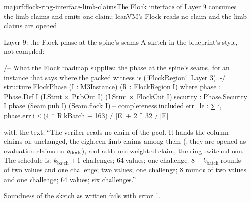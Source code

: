 \begin{finding}{major}{f:flock-ring-interface-limb-claims}{The Flock interface of Layer 9 consumes
the limb claims and emits one claim; leanVM's Flock reads no claim and the limb claims are opened}
\begin{change}{Layer 9: the Flock phase at the spine's seams}
\asproposed A sketch in the blueprint's style, not compiled:
\begin{leancode}
/-- What the Flock roadmap supplies: the phase at the spine's seams, for an instance that says
where the packed witness is (`FlockRegion`, Layer 3). -/
structure FlockPhase (I : M3Instance) (R : FlockRegion I) where
  phase : Phase.Def I (I.Stmt × PubOut I) (I.Stmt × FlockOut I)
  security : Phase.Security I phase (Seam.pub I) (Seam.flock I)   -- completeness included
  err_le : ∑ i, phase.err i ≤ (4 * R.kBatch + 163) / |E| + 2 ^ 32 / |E|
\end{leancode}
with the text: \enquote{The verifier reads no claim of the pool. It hands the column claims on
unchanged, the eighteen limb claims among them (: they are opened as
evaluation claims on $q_{\mathrm{flock}}$), and adds one weighted claim, the ring-switched one. The schedule
is: $k_{\mathrm{batch}} + 1$ challenges; 64 values; one challenge; $8 + k_{\mathrm{batch}}$ rounds
of two values and one challenge; two values; one challenge; 8 rounds of two values and one
challenge; 64 values; six challenges.}

\reason Soundness of the sketch as written fails with error 1.
\end{change}
\end{finding}

